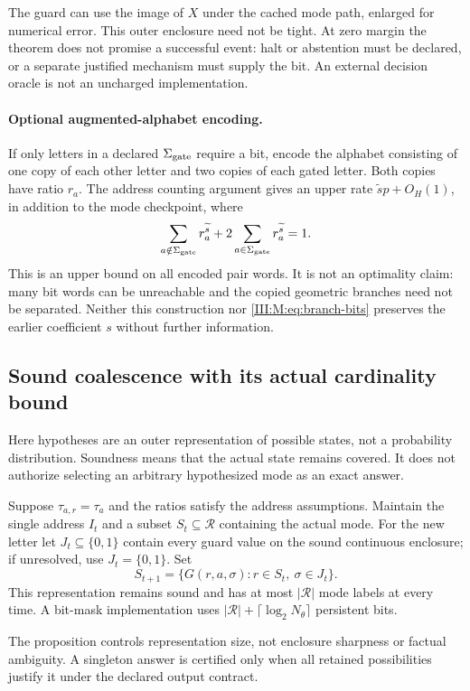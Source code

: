 The guard can use the image of $X$ under the cached mode path, enlarged
for numerical error. This outer enclosure need not be tight. At zero
margin the theorem does not promise a successful event: halt or abstention
must be declared, or a separate justified mechanism must supply the bit.
An external decision oracle is not an uncharged implementation.

\paragraph{Optional augmented-alphabet encoding.}
If only letters in a declared $\Sigma_{\rm gate}$ require a bit, encode
the alphabet consisting of one copy of each other letter and two copies
of each gated letter. Both copies have ratio $r_a$. The address counting
argument gives an upper rate $\widetilde s p+O_H(1)$, in addition to the
mode checkpoint, where
\[
 \sum_{a\notin\Sigma_{\rm gate}}r_a^{\widetilde s}
 +2\sum_{a\in\Sigma_{\rm gate}}r_a^{\widetilde s}=1.
\]
This is an upper bound on all encoded pair words. It is not an optimality
claim: many bit words can be unreachable and the copied geometric branches
need not be separated. Neither this construction nor \eqref{III:M:eq:branch-bits}
preserves the earlier coefficient $s$ without further information.

\subsection{Sound coalescence with its actual cardinality bound}
Here hypotheses are an outer representation of possible states, not a
probability distribution. Soundness means that the actual state remains
covered. It does not authorize selecting an arbitrary hypothesized mode
as an exact answer.

\begin{proposition}
\label{III:M:prop:oneway-coalescence}
Suppose $\tau_{a,r}=\tau_a$ and the ratios satisfy the address assumptions.
Maintain the single address $I_t$ and a subset $S_t\subseteq\mathcal R$
containing the actual mode. For the new letter let $J_t\subseteq\{0,1\}$
contain every guard value on the sound continuous enclosure; if unresolved,
use $J_t=\{0,1\}$. Set
\[
 S_{t+1}=\{G(r,a,\sigma):r\in S_t,\ \sigma\in J_t\}.
\]
This representation remains sound and has at most $|\mathcal R|$ mode
labels at every time. A bit-mask implementation uses
$|\mathcal R|+\lceil\log_2N_\theta\rceil$ persistent bits.
\end{proposition}

The proposition controls representation size, not enclosure sharpness or
factual ambiguity. A singleton answer is certified only when all retained
possibilities justify it under the declared output contract.

